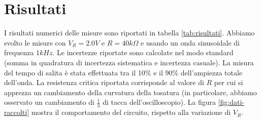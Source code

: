 \section{Risultati}\label{sec:risultati}
  I risultati numerici delle misure sono riportati in tabella \ref{tab:risultati}.
  Abbiamo svolto le misure con $V_R = 2.0V$ e $R = 40k\Omega$ e usando
  un onda sinusoidale di frequenza $1kHz$.
  Le incertezze riportate sono calcolate nel modo standard
  (somma in quadratura di incertezza sistematica e incertezza casuale).
  La misura del tempo di salita è stata effettuata tra il 10\% e il 90\%
  dell'ampiezza totale dell'onda.
  La resistenza critica riportata corrisponde al valore di $R$ per cui si
  apprezza un cambiamento della curvatura della tosatura (in particolare,
  abbiamo osservato un cambiamento di $\frac 1 3$ di tacca dell'oscilloscopio).
  La figura \ref{fig:dati-raccolti} mostra il comportamento del
  circuito, rispetto alla variazione di $V_R$.
